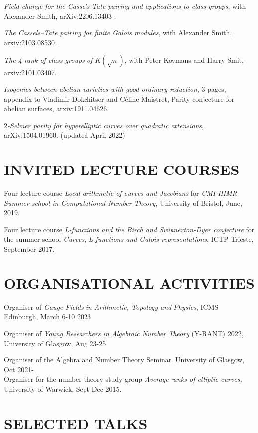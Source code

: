 \documentclass{res}
\begin{document}
\begin{resume}
{\it Field change for the Cassels-Tate pairing and applications to class groups}, with Alexander Smith, arXiv:2206.13403 . \

{\it The Cassels--Tate pairing for finite Galois modules}, with Alexander Smith, arxiv:2103.08530 . \

{\it The 4-rank of class groups of $K(\sqrt{n}) $}, with Peter Koymans and Harry Smit, arxiv:2101.03407. \

{\it Isogenies between abelian varieties with good ordinary reduction}, 3 pages, appendix to  Vladimir Dokchitser and C\'{e}line Maistret, {Parity conjecture for abelian surfaces},  arxiv:1911.04626. \

{\it $2$-Selmer parity for hyperelliptic curves over quadratic extensions},  arXiv:1504.01960. (updated April 2022)\


\section{INVITED LECTURE COURSES}

\bigskip
\vspace{-0.1in}
Four lecture course {\it Local arithmetic of curves and Jacobians} for {\it CMI-HIMR Summer school in Computational Number Theory}, University of Bristol, June, 2019.

Four lecture course {\it L-functions and the Birch and Swinnerton-Dyer conjecture} for the summer school {\it Curves, L-functions and Galois representations}, ICTP Trieste, September 2017.\

 \section{ORGANISATIONAL ACTIVITIES}
 
 \medskip
 
 \textup{Organiser of \textit{Gauge Fields in Arithmetic, Topology and Physics}},   \textup{ICMS Edinburgh, March 6-10 2023}  
 
\textup{Organiser of \textit{Young Researchers in Algebraic Number Theory} (Y-RANT) 2022},   \textup{University of Glasgow, Aug 23-25}  
 
\textup{Organiser of the  Algebra and Number Theory Seminar, }   \textup{University of Glasgow, Oct 2021-}\medskip\\
\textup{Organiser for the number theory study group} {\it Average ranks of elliptic curves,} \textup{University of Warwick, Sept-Dec 2015.} 

\section{SELECTED TALKS}         
        

\end{resume}
\end{document}
